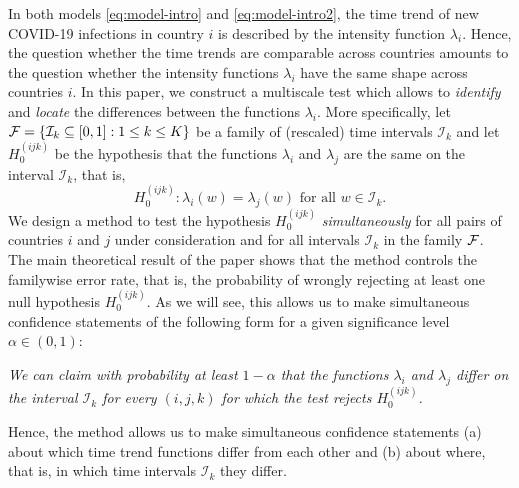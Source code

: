 \documentclass[a4paper,12pt]{article}
\numberwithin{equation}{section}
\begin{document}
In both models \eqref{eq:model-intro} and \eqref{eq:model-intro2}, the time trend of new COVID-19 infections in country $i$ is described by the intensity function $\lambda_i$. Hence, the question whether the time trends are comparable across countries amounts to the question whether the intensity functions $\lambda_i$ have the same shape across countries $i$. In this paper, we construct a multiscale test which allows to \textit{identify} and \textit{locate} the differences between the functions $\lambda_i$. More specifically, let $\mathcal{F} = \{ \mathcal{I}_k \subseteq[0,1] : 1 \le k \le K \}$ be a family of (rescaled) time intervals $\mathcal{I}_k$ and let $H_0^{(ijk)}$ be the hypothesis that the functions $\lambda_i$ and $\lambda_j$ are the same on the interval $\mathcal{I}_k$, that is, 
\[ H_0^{(ijk)}: \lambda_i(w) = \lambda_j(w) \text{ for all } w \in \mathcal{I}_k. \]
We design a method to test the hypothesis $H_0^{(ijk)}$ \textit{simultaneously} for all pairs of countries $i$ and $j$ under consideration and for all intervals $\mathcal{I}_k$ in the family $\mathcal{F}$. The main theoretical result of the paper shows that the method controls the familywise error rate, that is, the probability of wrongly rejecting at least one null hypothesis $H_0^{(ijk)}$. As we will see, this allows us to make simultaneous confidence statements of the following form for a given significance level $\alpha \in (0,1)$: 
\begin{center}
\begin{minipage}[c][1.25cm][c]{13cm}
\textit{We can claim with probability at least $1-\alpha$ that the functions $\lambda_i$ and $\lambda_j$ differ on the interval $\mathcal{I}_k$ for every $(i,j,k)$ for which the test rejects $H_0^{(ijk)}$.} 
\end{minipage}
\end{center}
Hence, the method allows us to make simultaneous confidence statements (a) about which time trend functions differ from each other and (b) about where, that is, in which time intervals $\mathcal{I}_{k}$ they differ. 
\end{document}

